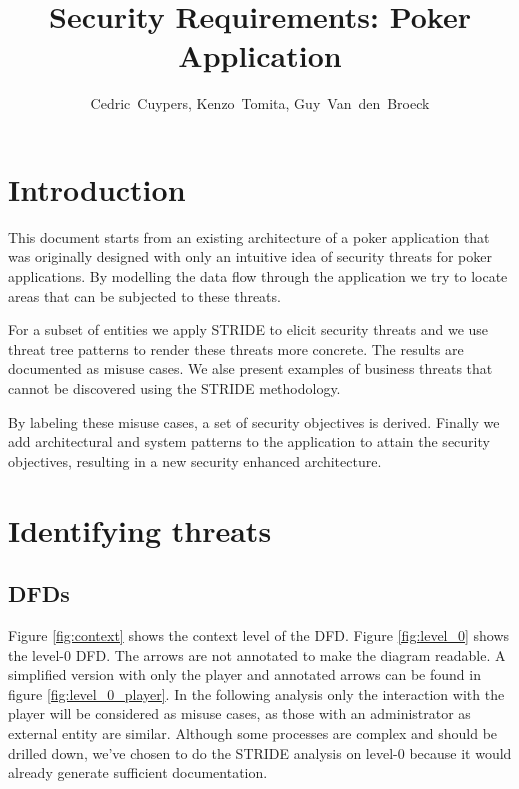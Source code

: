 \documentclass[a4paper,11pt]{report}
\author{Cedric~Cuypers, Kenzo~Tomita, Guy~Van~den~Broeck}
\title{Security Requirements: Poker Application}
\begin{document}
\maketitle
\tableofcontents

\listoffigures

\chapter{Introduction}
This document starts from an existing architecture of a poker application that was originally designed with only an intuitive idea of security threats for poker applications. By modelling the data flow through the application we try to locate areas that can be subjected to these threats.

For a subset of entities we apply STRIDE to elicit security threats and we use threat tree patterns to render these threats more concrete. The results are documented as misuse cases. We alse present examples of business threats that cannot be discovered using the STRIDE methodology.

By labeling these misuse cases, a set of security objectives is derived. Finally we add architectural and system patterns to the application to attain the security objectives, resulting in a new security enhanced architecture.


\chapter{Identifying threats}
\label{IdentifyingThreats}
\section{DFDs}
Figure \ref{fig:context} shows the context level of the DFD. Figure \ref{fig:level_0} shows the level-0 DFD. The arrows are not annotated to make the diagram readable. A simplified version with only the player and annotated arrows can be found in figure \ref{fig:level_0_player}. In the following analysis only the interaction with the player will be considered as misuse cases, as those with an administrator as external entity are similar. Although some processes are complex and should be drilled down, we've chosen to do the STRIDE analysis on level-0 because it would already generate sufficient documentation.
\end{document}
